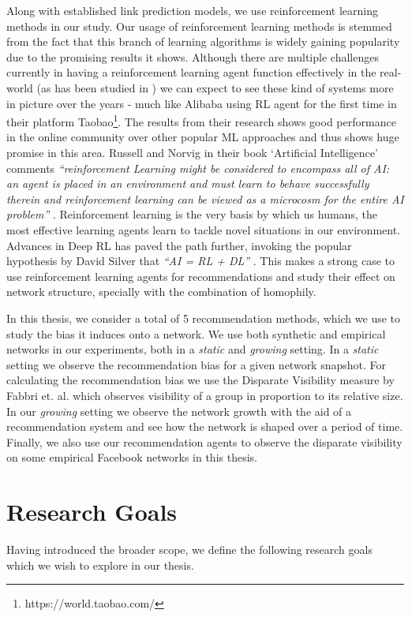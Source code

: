 Along with established link prediction models, we use reinforcement learning methods in our study. Our usage of reinforcement learning methods is stemmed from the fact that this branch of learning algorithms is widely gaining popularity due to the promising results it shows. Although there are multiple challenges currently in having a reinforcement learning agent function effectively in the real-world (as has been studied in \cite{dulac2019challenges}) we can expect to see these kind of systems more in picture over the years - much like Alibaba using RL agent for the first time in their platform Taobao\footnote{https://world.taobao.com/}. The results from their research shows good performance in the online community over other popular ML approaches \cite{jin2018real,shi2019virtual} and thus shows huge promise in this area. Russell and Norvig in their book `Artificial Intelligence' comments \textit{``reinforcement Learning might be considered to encompass all of AI: an agent is placed in an environment and must learn to behave successfully therein and reinforcement learning can be viewed as a microcosm for the entire AI problem''} \cite{russell2016artificial}. Reinforcement learning is the very basis by which us humans, the most effective learning agents learn to tackle novel situations in our environment. Advances in Deep RL has paved the path further, invoking the popular hypothesis by David Silver that \textit{``AI = RL + DL''} \cite{davidsilvertut}. This makes a strong case to use reinforcement learning agents for recommendations and study their effect on network structure, specially with the combination of homophily.

In this thesis, we consider a total of 5 recommendation methods, which we use to study the bias it induces onto a network. We use both synthetic and empirical networks in our experiments, both in a \textit{static} and \textit{growing} setting. In a \textit{static} setting we observe the recommendation bias for a given network snapshot. For calculating the recommendation bias we use the Disparate Visibility measure by Fabbri et. al. \cite{fabbri2020effect} which observes visibility of a group in proportion to its relative size. In our \textit{growing} setting we observe the network growth with the aid of a recommendation system and see how the network is shaped over a period of time. Finally, we also use our recommendation agents to observe the disparate visibility on some empirical Facebook networks in this thesis.

\section{Research Goals}
\label{research_goals}
Having introduced the broader scope, we define the following research goals which we wish to explore in our thesis.

